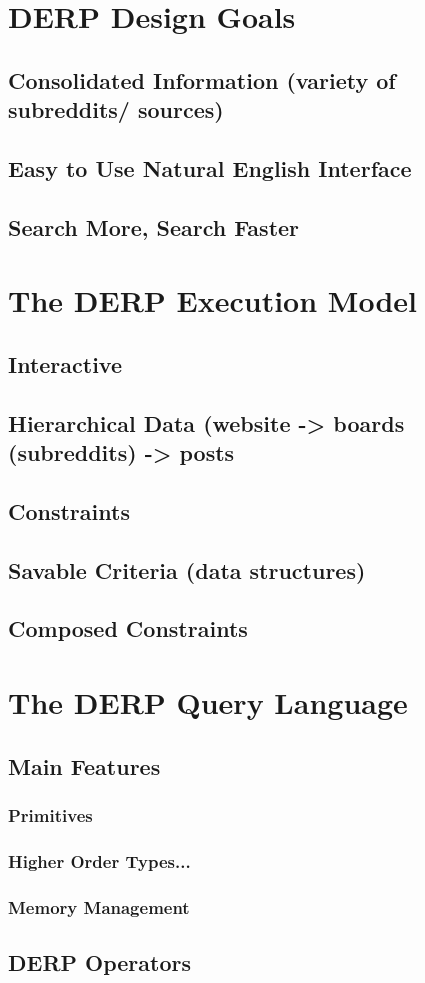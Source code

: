 \documentclass{article}
\begin{document}
\newpage
\section{\textbf{DERP Design Goals}}
\subsection{Consolidated Information (variety of subreddits/ sources)}
\subsection{Easy to Use Natural English Interface}
\subsection{Search More, Search Faster}



\newpage
\section{\textbf{The DERP Execution Model}}
\subsection{Interactive}
\subsection{Hierarchical Data (website -> boards (subreddits) -> posts}
\subsection{Constraints}
\subsection{Savable Criteria (data structures)}
\subsection{Composed Constraints}



\newpage
\section{\textbf{The DERP Query Language}}
\subsection{Main Features}
\subsubsection{Primitives}
\subsubsection{Higher Order Types...}
\subsubsection{Memory Management}
\subsection{DERP Operators}
\end{document}
